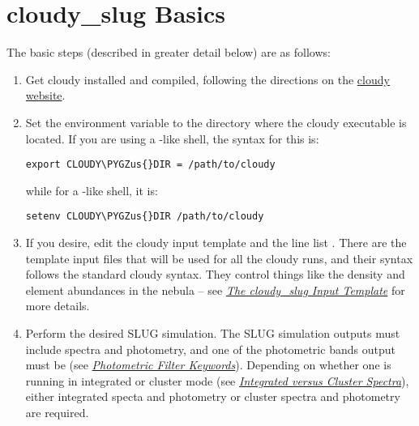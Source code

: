 \documentclass[letterpaper,10pt,english]{sphinxmanual}
\def\PYGZus{\char`\_}
\begin{document}
\section{cloudy\_slug Basics}
\label{cloudy:cloudy-slug-basics}
The basic steps (described in greater detail below) are as follows:
\begin{enumerate}
\item {} 
Get cloudy installed and compiled, following the directions on the
\href{http://nublado.org/}{cloudy website}.

\item {} 
Set the environment variable  to the directory where
the cloudy executable  is located.  If you are using
a -like shell, the syntax for this is:

\begin{Verbatim}[commandchars=\\\{\}]
export CLOUDY\PYGZus{}DIR = /path/to/cloudy
\end{Verbatim}

while for a -like shell, it is:

\begin{Verbatim}[commandchars=\\\{\}]
setenv CLOUDY\PYGZus{}DIR /path/to/cloudy
\end{Verbatim}

\item {} 
If you desire, edit the cloudy input template
 and the line list
. There are the template input files
that will be used for all the cloudy runs, and their syntax follows
the standard cloudy syntax. They control things like the density and
element abundances in the nebula -- see {\hyperref[cloudy:ssec\string-cloudy\string-template]{\emph{The cloudy\_slug Input Template}}}
for more details.

\item {} 
Perform the desired SLUG simulation. The SLUG simulation outputs
must include spectra and photometry, and one of the photometric
bands output must be  (see
{\hyperref[parameters:ssec\string-phot\string-keywords]{\emph{Photometric Filter Keywords}}}). Depending on whether one is running in
integrated or cluster mode (see
{\hyperref[cloudy:sssec\string-cloudy\string-integrated\string-cluster]{\emph{Integrated versus Cluster Spectra}}}), either integrated specta
and photometry or cluster spectra and photometry are
required.


\end{enumerate}
\end{document}
